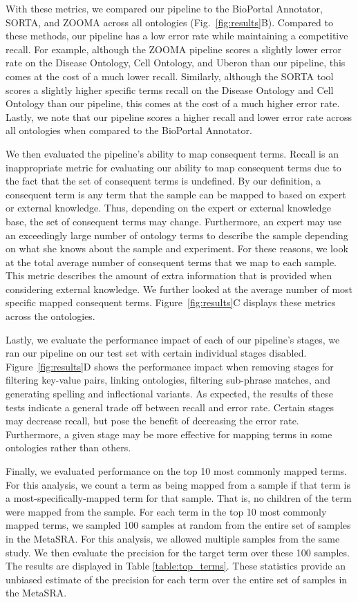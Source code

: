 With these metrics, we compared our pipeline to the BioPortal Annotator, SORTA, and ZOOMA across all ontologies (Fig.~\ref{fig:results}B).  Compared to these methods, our pipeline has a low error rate while maintaining a competitive recall.  For example, although the ZOOMA pipeline scores a slightly lower error rate on the Disease Ontology, Cell Ontology, and Uberon than our pipeline, this comes at the cost of a much lower recall. Similarly, although the SORTA tool scores a slightly higher specific terms recall on the Disease Ontology and Cell Ontology than our pipeline, this comes at the cost of a much higher error rate.  Lastly, we note that our pipeline scores a higher recall and lower error rate across all ontologies when compared to the BioPortal Annotator.  

We then evaluated the pipeline's ability to map consequent terms. Recall is an inappropriate metric for evaluating our ability to map consequent terms  due to the fact that the set of consequent terms is undefined.  By our definition, a consequent term is any term that the sample can be mapped to based on expert or external knowledge.  Thus, depending on the expert or external knowledge base, the set of consequent terms may change.  Furthermore, an expert may use an exceedingly large number of ontology terms to describe the sample depending on what she knows about the sample and experiment. For these reasons, we look at the total average number of consequent terms that we map to each sample.  This metric describes the amount of extra information that is provided when considering external knowledge.  We further looked at the average number of most specific mapped consequent terms.   Figure~\ref{fig:results}C displays these metrics across the ontologies.

Lastly, we evaluate the performance impact of each of our pipeline's stages, we ran our pipeline on our test set with certain individual stages disabled.  Figure~\ref{fig:results}D shows the performance impact when removing stages for filtering key-value pairs, linking ontologies, filtering sub-phrase matches,  and generating spelling and inflectional variants. As expected, the results of these tests indicate a general trade off between recall and error rate.  Certain stages may decrease recall, but pose the benefit of decreasing the error rate.  Furthermore, a given stage may be more effective for mapping terms in some ontologies rather than others.

Finally, we evaluated performance on the top 10 most commonly mapped terms.  For this analysis, we count a term as being mapped from a sample if that term is a most-specifically-mapped term for that sample.  That is, no children of the term were mapped from the sample.  For each term in the top 10 most commonly mapped terms, we sampled 100 samples at random from the entire set of samples in the MetaSRA.  For this analysis, we allowed multiple samples from the same study.  We then evaluate the precision for the target term over these 100 samples. The results are displayed in Table \ref{table:top_terms}.  These statistics provide an unbiased estimate of the precision for each term over the entire set of samples in the MetaSRA.  

